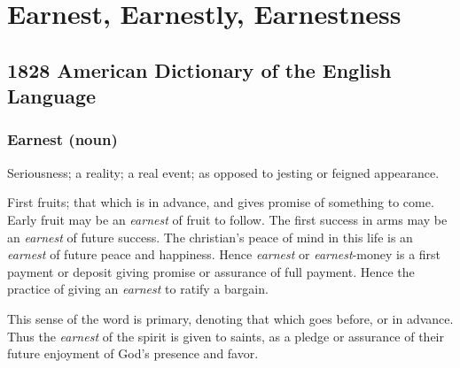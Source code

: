 \section{Earnest, Earnestly, Earnestness}
	\label{EARNEST}
	

\subsection{1828 American Dictionary of the English Language} %
	\label{EARNEST-1828}

	\subsubsection{Earnest (noun)}
	
		\begin{compactitem}
			\item Seriousness; a reality; a real event; as opposed to jesting or feigned appearance.
			\item[1] First fruits; that which is in advance, and gives promise of something to come. Early fruit may be an \textit{earnest} of fruit to follow. The first success in arms may be an \textit{earnest} of future success. The christian's peace of mind in this life is an \textit{earnest} of future peace and happiness. Hence \textit{earnest} or \textit{earnest}-money is a first payment or deposit giving promise or assurance of full payment. Hence the practice of giving an \textit{earnest} to ratify a bargain.

			This sense of the word is primary, denoting that which goes before, or in advance. Thus the \textit{earnest} of the spirit is given to saints, as a pledge or assurance of their future enjoyment of God's presence and favor.
		\end{compactitem}


